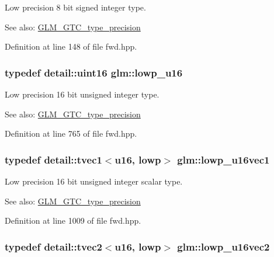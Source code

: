 Low precision 8 bit signed integer type. \begin{Desc}
\item[See also:]\hyperlink{group__gtc__type__precision}{GLM\_\-GTC\_\-type\_\-precision} \end{Desc}


Definition at line 148 of file fwd.hpp.\hypertarget{group__gtc__type__precision_g22c5364f27caa0a6eb0627cbc21e46be}{
\subsubsection[lowp\_\-u16]{\setlength{\rightskip}{0pt plus 5cm}typedef detail::uint16 {\bf glm::lowp\_\-u16}}}
\label{group__gtc__type__precision_g22c5364f27caa0a6eb0627cbc21e46be}


Low precision 16 bit unsigned integer type. \begin{Desc}
\item[See also:]\hyperlink{group__gtc__type__precision}{GLM\_\-GTC\_\-type\_\-precision} \end{Desc}


Definition at line 765 of file fwd.hpp.\hypertarget{group__gtc__type__precision_g25464b09e8e3c63f6896605e0c997eb1}{
\subsubsection[lowp\_\-u16vec1]{\setlength{\rightskip}{0pt plus 5cm}typedef detail::tvec1$<$u16, lowp$>$ {\bf glm::lowp\_\-u16vec1}}}
\label{group__gtc__type__precision_g25464b09e8e3c63f6896605e0c997eb1}


Low precision 16 bit unsigned integer scalar type. \begin{Desc}
\item[See also:]\hyperlink{group__gtc__type__precision}{GLM\_\-GTC\_\-type\_\-precision} \end{Desc}


Definition at line 1009 of file fwd.hpp.\hypertarget{group__gtc__type__precision_gff5ca5a8bc621bb8f4b28f046c0de508}{
\subsubsection[lowp\_\-u16vec2]{\setlength{\rightskip}{0pt plus 5cm}typedef detail::tvec2$<$u16, lowp$>$ {\bf glm::lowp\_\-u16vec2}}}
\label{group__gtc__type__precision_gff5ca5a8bc621bb8f4b28f046c0de508}


